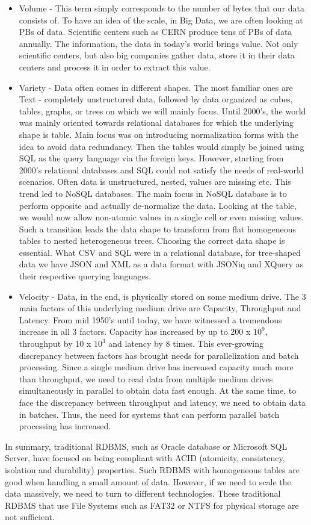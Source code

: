 \begin{itemize}
	\item Volume - This term simply corresponds to the number of bytes that our data consists of. To have an idea of the scale, in Big Data, we are often looking at PBs of data. Scientific centers such as CERN produce tens of PBs of data annually. The information, the data in today's world brings value. Not only scientific centers, but also big companies gather data, store it in their data centers and process it in order to extract this value.
	\item Variety - Data often comes in different shapes. The most familiar ones are Text - completely unstructured data, followed by data organized as cubes, tables, graphs, or trees on which we will mainly focus. Until 2000's, the world was mainly oriented towards relational databases for which the underlying shape is table. Main focus was on introducing normalization forms with the idea to avoid data redundancy. Then the tables would simply be joined using SQL as the query language via the foreign keys. However, starting from 2000's relational databases and SQL could not satisfy the needs of real-world scenarios. Often data is unstructured, nested, values are missing etc. This trend led to NoSQL databases. The main focus in NoSQL database is to perform opposite and actually de-normalize the data. Looking at the table, we would now allow non-atomic values in a single cell or even missing values. Such a transition leads the data shape to transform from flat homogeneous tables to nested heterogeneous trees. Choosing the correct data shape is essential. What CSV and SQL were in a relational database, for tree-shaped data we have JSON and XML as a data format with JSONiq and XQuery as their respective querying languages.
	\item Velocity - Data, in the end, is physically stored on some medium drive. The 3 main factors of this underlying medium drive are Capacity, Throughput and Latency. From mid 1950's until today, we have witnessed a tremendous increase in all 3 factors. Capacity has increased by up to 200 x $10^9$, throughput by 10 x $10^3$  and latency by 8 times. This ever-growing discrepancy between factors has brought needs for parallelization and batch processing. Since a single medium drive has increased capacity much more than throughput, we need to read data from multiple medium drives simultaneously in parallel to obtain data fast enough. At the same time, to face the discrepancy between throughput and latency, we need to obtain data in batches. Thus, the need for systems that can perform parallel batch processing has increased.
\end{itemize}
In summary, traditional RDBMS, such as Oracle database or Microsoft SQL Server, have focused on being compliant with ACID (atomicity, consistency, isolation and durability) properties. Such RDBMS with homogeneous tables are good when handling a small amount of data. However, if we need to scale the data massively, we need to turn to different technologies. These traditional RDBMS that use File Systems such as FAT32 or NTFS for physical storage are not sufficient. \cite{BigDataCourse} %


